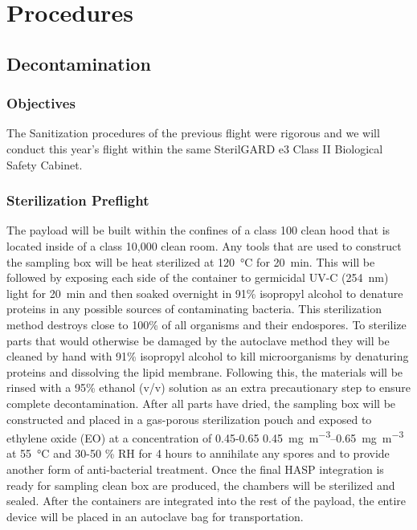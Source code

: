 \section{Procedures}
\label{sec:Procedures}

\subsection{Decontamination}
\label{subsec:Decontamination}

\subsubsection{Objectives}
The Sanitization procedures of the previous flight were rigorous and we will conduct this year's flight within the same SterilGARD e3 Class II Biological Safety Cabinet. 
\subsubsection{Sterilization Preflight}
The payload will be built within the confines of a class 100 clean hood that is located inside of a class 10,000 clean room. Any tools that are used to construct the sampling box will be heat sterilized at \SI{120}{\celsius} for \SI{20}{\minute}. This will be followed by exposing each side of the container to germicidal UV-C (\SI{254}{\nano\meter}) light for \SI{20}{\minute} and then soaked overnight in 91\% isopropyl alcohol to denature proteins in any possible sources of contaminating bacteria. This sterilization method destroys close to 100\% of all organisms and their endospores. To sterilize parts that would otherwise be damaged by the autoclave method they will be cleaned by hand with 91\% isopropyl alcohol to kill microorganisms by denaturing proteins and dissolving the lipid membrane. Following this, the materials will be rinsed with a 95\% ethanol (v/v) solution as an extra precautionary step to ensure complete decontamination. After all parts have dried, the sampling box will be constructed and placed in a gas-porous sterilization pouch and exposed to ethylene oxide (EO) at a concentration of 0.45-0.65 \SIrange{0.45}{0.65}{\milli\gram\per\meter\cubed} at \SI{55}{\celsius} and 30-50 \% RH for \num{4} hours to annihilate any spores and to provide another form of anti-bacterial treatment.  Once the final HASP integration is ready for sampling clean box are produced, the chambers will be sterilized and sealed. After the containers are integrated into the rest of the payload, the entire device will be placed in an autoclave bag for transportation.

